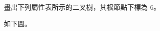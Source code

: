 \startEXERCISE
畫出下列屬性表所示的二叉樹，其根節點下標為 6。

\stopEXERCISE

\startANSWER
如下圖。

\externalfigure[e10_4_1-1]
\stopANSWER
